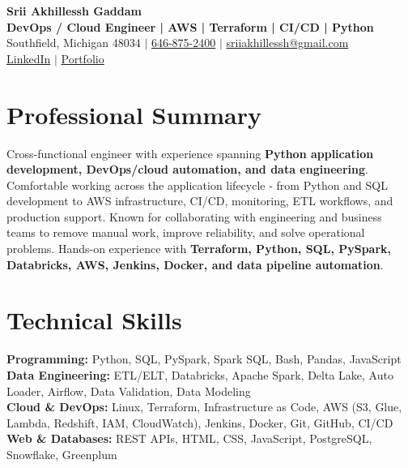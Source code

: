 \documentclass[letterpaper,10pt]{article}
\begin{document}
\fontsize{9.35pt}{10.45pt}\selectfont

\begin{center}
    {\LARGE \textbf{Srii Akhillessh Gaddam}} \\[-1pt]
    \textbf{DevOps / Cloud Engineer | AWS | Terraform | CI/CD | Python} \\[2pt]
    Southfield, Michigan 48034 $|$
    \href{tel:6468752400}{646-875-2400} $|$
    \href{mailto:sriiakhillessh@gmail.com}{sriiakhillessh@gmail.com} \\[1pt]
    \href{https://www.linkedin.com/in/srii-akhiilessh-gaddam-b48668191/}{LinkedIn} $|$
    \href{https://sriiakhillesshg.github.io/portfolio/}{Portfolio}
\end{center}
\vspace{-8pt}

\section{Professional Summary}
\small{Cross-functional engineer with experience spanning \textbf{Python application development, DevOps/cloud automation, and data engineering}. Comfortable working across the application lifecycle - from Python and SQL development to AWS infrastructure, CI/CD, monitoring, ETL workflows, and production support. Known for collaborating with engineering and business teams to remove manual work, improve reliability, and solve operational problems. Hands-on experience with \textbf{Terraform, Python, SQL, PySpark, Databricks, AWS, Jenkins, Docker, and data pipeline automation}.}

\section{Technical Skills}
\small{
\textbf{Programming:} Python, SQL, PySpark, Spark SQL, Bash, Pandas, JavaScript \\
\textbf{Data Engineering:} ETL/ELT, Databricks, Apache Spark, Delta Lake, Auto Loader, Airflow, Data Validation, Data Modeling \\
\textbf{Cloud \& DevOps:} Linux, Terraform, Infrastructure as Code, AWS (S3, Glue, Lambda, Redshift, IAM, CloudWatch), Jenkins, Docker, Git, GitHub, CI/CD \\
\textbf{Web \& Databases:} REST APIs, HTML, CSS, JavaScript, PostgreSQL, Snowflake, Greenplum
}
\end{document}
